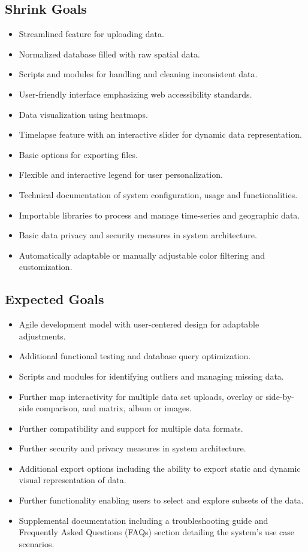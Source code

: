 \documentclass[12pt]{article}
\begin{document}
\subsection*{Shrink Goals}
\begin{itemize}
    \item  Streamlined feature for uploading data. 
    \item Normalized database filled with raw spatial data.
    \item Scripts and modules for handling and cleaning inconsistent data.
    \item User-friendly interface emphasizing web accessibility standards. 
    \item Data visualization using heatmaps.  
    \item Timelapse feature with an interactive slider for dynamic data representation. 
    \item Basic options for exporting files.
    \item Flexible and interactive legend for user personalization. 
    \item Technical documentation of system configuration, usage and functionalities.
    \item Importable libraries to process and manage time-series and geographic data.
    \item Basic data privacy and security measures in system architecture.
    \item Automatically adaptable or manually adjustable color filtering and customization.
\end{itemize}

\subsection*{Expected Goals}
\begin{itemize}
    \item  Agile development model with user-centered design for adaptable adjustments. 
    \item Additional functional testing and database query optimization. 
    \item Scripts and modules for identifying outliers and managing missing data.
    \item Further map interactivity for multiple data set uploads, overlay or side-by-side comparison, and matrix, album or images.
    \item Further compatibility and support for multiple data formats.
    \item Further security and privacy measures in system architecture.
    \item Additional export options including the ability to export static and dynamic visual representation of data.
    \item Further functionality enabling users to select and explore subsets of the data.
    \item Supplemental documentation including a troubleshooting guide and Frequently Asked Questions (FAQs) section detailing the system’s use case scenarios.
\end{itemize}
\end{document}
